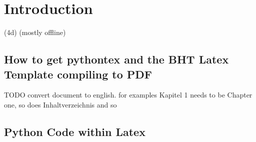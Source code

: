 
\chapter{Introduction}


(4d) (mostly offline)

\section{How to get pythontex and the BHT Latex Template compiling to PDF }


TODO convert document to english. for examples Kapitel 1 needs to be Chapter one, so does Inhaltverzeichnis and so 


\section{Python Code within Latex} 
\label{K1_Python in Latex}



